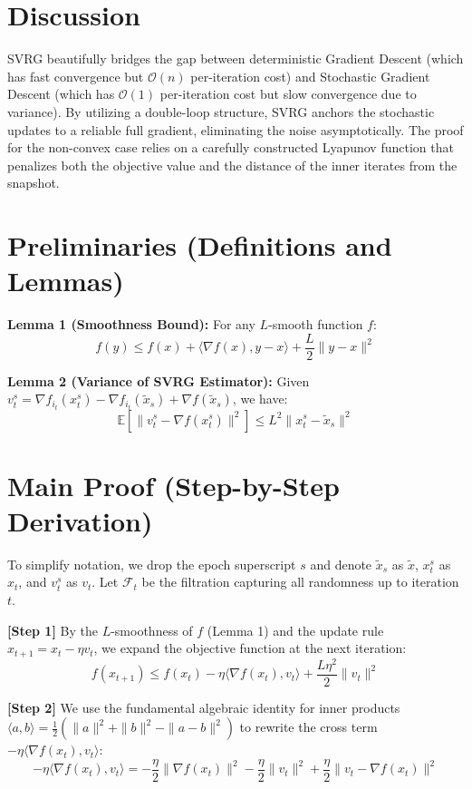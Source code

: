 \documentclass[11pt]{article}
\begin{document}
\section*{Discussion}
SVRG beautifully bridges the gap between deterministic Gradient Descent (which has fast convergence but $\mathcal{O}(n)$ per-iteration cost) and Stochastic Gradient Descent (which has $\mathcal{O}(1)$ per-iteration cost but slow convergence due to variance). By utilizing a double-loop structure, SVRG anchors the stochastic updates to a reliable full gradient, eliminating the noise asymptotically. The proof for the non-convex case relies on a carefully constructed Lyapunov function that penalizes both the objective value and the distance of the inner iterates from the snapshot.

\section*{Preliminaries (Definitions and Lemmas)}
\textbf{Lemma 1 (Smoothness Bound):} For any $L$-smooth function $f$:
\begin{equation}
    f(y) \le f(x) + \langle \nabla f(x), y - x \rangle + \frac{L}{2}\|y - x\|^2
\end{equation}

\textbf{Lemma 2 (Variance of SVRG Estimator):} 
Given $v_t^s = \nabla f_{i_t}(x_t^s) - \nabla f_{i_t}(\tilde{x}_s) + \nabla f(\tilde{x}_s)$, we have:
\begin{equation}
    \mathbb{E}[\|v_t^s - \nabla f(x_t^s)\|^2] \le L^2 \|x_t^s - \tilde{x}_s\|^2
\end{equation}

\section*{Main Proof (Step-by-Step Derivation)}
To simplify notation, we drop the epoch superscript $s$ and denote $\tilde{x}_s$ as $\tilde{x}$, $x_t^s$ as $x_t$, and $v_t^s$ as $v_t$. Let $\mathcal{F}_t$ be the filtration capturing all randomness up to iteration $t$.

\textbf{[Step 1]} By the $L$-smoothness of $f$ (Lemma 1) and the update rule $x_{t+1} = x_t - \eta v_t$, we expand the objective function at the next iteration:
\begin{equation} \tag{Step 1}
    f(x_{t+1}) \le f(x_t) - \eta \langle \nabla f(x_t), v_t \rangle + \frac{L\eta^2}{2} \|v_t\|^2
\end{equation}

\textbf{[Step 2]} We use the fundamental algebraic identity for inner products $\langle a, b \rangle = \frac{1}{2}(\|a\|^2 + \|b\|^2 - \|a - b\|^2)$ to rewrite the cross term $-\eta \langle \nabla f(x_t), v_t \rangle$:
\begin{equation} \tag{Step 2}
    -\eta \langle \nabla f(x_t), v_t \rangle = -\frac{\eta}{2} \|\nabla f(x_t)\|^2 - \frac{\eta}{2} \|v_t\|^2 + \frac{\eta}{2} \|v_t - \nabla f(x_t)\|^2
\end{equation}
\end{document}
